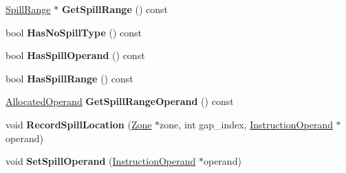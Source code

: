 \begin{DoxyCompactItemize}
\item 
\hyperlink{classv8_1_1internal_1_1compiler_1_1_spill_range}{Spill\+Range} $\ast$ {\bfseries Get\+Spill\+Range} () const \hypertarget{classv8_1_1internal_1_1compiler_1_1_top_level_live_range_aa39e0a220e0077cc5815e80ce7a6ab61}{}\label{classv8_1_1internal_1_1compiler_1_1_top_level_live_range_aa39e0a220e0077cc5815e80ce7a6ab61}

\item 
bool {\bfseries Has\+No\+Spill\+Type} () const \hypertarget{classv8_1_1internal_1_1compiler_1_1_top_level_live_range_abcd9792665af3a29e56350e72645dc54}{}\label{classv8_1_1internal_1_1compiler_1_1_top_level_live_range_abcd9792665af3a29e56350e72645dc54}

\item 
bool {\bfseries Has\+Spill\+Operand} () const \hypertarget{classv8_1_1internal_1_1compiler_1_1_top_level_live_range_a1c8193b462514e2dfdbdae597f78dae1}{}\label{classv8_1_1internal_1_1compiler_1_1_top_level_live_range_a1c8193b462514e2dfdbdae597f78dae1}

\item 
bool {\bfseries Has\+Spill\+Range} () const \hypertarget{classv8_1_1internal_1_1compiler_1_1_top_level_live_range_a582683b259a2b06f198d6d12466e9949}{}\label{classv8_1_1internal_1_1compiler_1_1_top_level_live_range_a582683b259a2b06f198d6d12466e9949}

\item 
\hyperlink{classv8_1_1internal_1_1compiler_1_1_allocated_operand}{Allocated\+Operand} {\bfseries Get\+Spill\+Range\+Operand} () const \hypertarget{classv8_1_1internal_1_1compiler_1_1_top_level_live_range_aff7c23e768952b4bbdd602f42404bb4a}{}\label{classv8_1_1internal_1_1compiler_1_1_top_level_live_range_aff7c23e768952b4bbdd602f42404bb4a}

\item 
void {\bfseries Record\+Spill\+Location} (\hyperlink{classv8_1_1internal_1_1_zone}{Zone} $\ast$zone, int gap\+\_\+index, \hyperlink{classv8_1_1internal_1_1compiler_1_1_instruction_operand}{Instruction\+Operand} $\ast$operand)\hypertarget{classv8_1_1internal_1_1compiler_1_1_top_level_live_range_a00fd18fc9669b937a81e4e47a7da3cb7}{}\label{classv8_1_1internal_1_1compiler_1_1_top_level_live_range_a00fd18fc9669b937a81e4e47a7da3cb7}

\item 
void {\bfseries Set\+Spill\+Operand} (\hyperlink{classv8_1_1internal_1_1compiler_1_1_instruction_operand}{Instruction\+Operand} $\ast$operand)\hypertarget{classv8_1_1internal_1_1compiler_1_1_top_level_live_range_a2e1525f6f2e5a12359d29b1d0563e0ba}{}\label{classv8_1_1internal_1_1compiler_1_1_top_level_live_range_a2e1525f6f2e5a12359d29b1d0563e0ba}


\end{DoxyCompactItemize}
